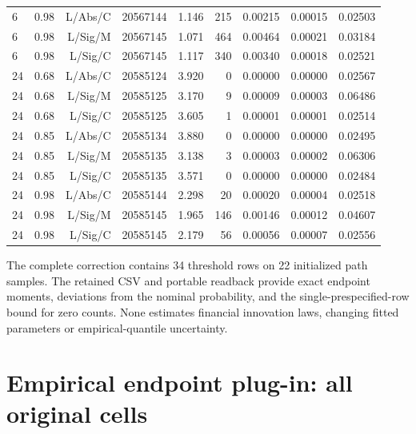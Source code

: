 \documentclass[11pt,a4paper]{article}
\begin{document}
\begin{longtable}{lrrrrrrrr}
6 & 0.98 & L/Abs/C & 20567144 & 1.146 & 215 & 0.00215 & 0.00015 & 0.02503 \\
6 & 0.98 & L/Sig/M & 20567145 & 1.071 & 464 & 0.00464 & 0.00021 & 0.03184 \\
6 & 0.98 & L/Sig/C & 20567145 & 1.117 & 340 & 0.00340 & 0.00018 & 0.02521 \\
24 & 0.68 & L/Abs/C & 20585124 & 3.920 & 0 & 0.00000 & 0.00000 & 0.02567 \\
24 & 0.68 & L/Sig/M & 20585125 & 3.170 & 9 & 0.00009 & 0.00003 & 0.06486 \\
24 & 0.68 & L/Sig/C & 20585125 & 3.605 & 1 & 0.00001 & 0.00001 & 0.02514 \\
24 & 0.85 & L/Abs/C & 20585134 & 3.880 & 0 & 0.00000 & 0.00000 & 0.02495 \\
24 & 0.85 & L/Sig/M & 20585135 & 3.138 & 3 & 0.00003 & 0.00002 & 0.06306 \\
24 & 0.85 & L/Sig/C & 20585135 & 3.571 & 0 & 0.00000 & 0.00000 & 0.02484 \\
24 & 0.98 & L/Abs/C & 20585144 & 2.298 & 20 & 0.00020 & 0.00004 & 0.02518 \\
24 & 0.98 & L/Sig/M & 20585145 & 1.965 & 146 & 0.00146 & 0.00012 & 0.04607 \\
24 & 0.98 & L/Sig/C & 20585145 & 2.179 & 56 & 0.00056 & 0.00007 & 0.02556 \\
\end{longtable}
\endgroup

The complete correction contains 34 threshold rows on 22 initialized path samples.
The retained CSV and portable readback provide exact endpoint moments,
deviations from the nominal probability, and the single-prespecified-row bound
for zero counts. None estimates financial innovation laws, changing fitted
parameters or empirical-quantile uncertainty.\section{Empirical endpoint plug-in: all original cells}\label{sup:levy-empirical}
\end{document}
